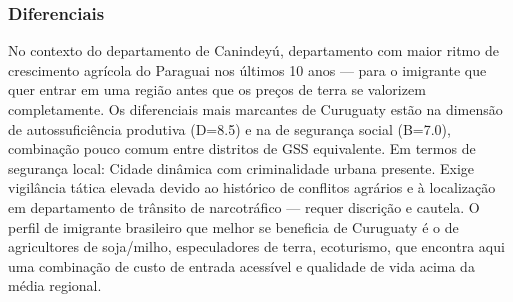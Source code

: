 \subsubsection*{Diferenciais}\label{dif-curuguaty-1407}
No contexto do departamento de Canindeyú, departamento com maior ritmo de crescimento agrícola do Paraguai nos últimos 10 anos — para o imigrante que quer entrar em uma região antes que os preços de terra se valorizem completamente. Os diferenciais mais marcantes de Curuguaty estão na dimensão de autossuficiência produtiva (D=8.5) e na de segurança social (B=7.0), combinação pouco comum entre distritos de GSS equivalente. Em termos de segurança local: Cidade dinâmica com criminalidade urbana presente. Exige vigilância tática elevada devido ao histórico de conflitos agrários e à localização em departamento de trânsito de narcotráfico — requer discrição e cautela. O perfil de imigrante brasileiro que melhor se beneficia de Curuguaty é o de agricultores de soja/milho, especuladores de terra, ecoturismo, que encontra aqui uma combinação de custo de entrada acessível e qualidade de vida acima da média regional.
